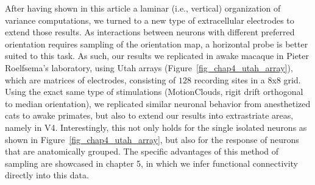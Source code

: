 After having shown in this article a laminar (i.e., vertical) organization of variance computations, we turned to a new type of extracellular electrodes to extend those results. As interactions between neurons with different preferred orientation requires sampling of the orientation map, a horizontal probe is better suited to this task. As such, our results we replicated in awake macaque in Pieter Roelfsema's laboratory, using Utah arrays (Figure~\ref{fig_chap4_utah_array}), which are matrices of electrodes, consisting of $128$ recording sites in a 8x8 grid. Using the exact same type of stimulations (MotionClouds, rigit drift orthogonal to median orientation), we replicated similar neuronal behavior from anesthetized cats to awake primates, but also to extend our results into extrastriate areas, namely in V4. Interestingly, this not only holds for the single isolated neurons as shown in Figure~\ref{fig_chap4_utah_array}, but also for the response of neurons that are anatomically grouped. The specific advantages of this method of sampling are showcased in chapter 5, in which we infer functional connectivity directly into this data.


